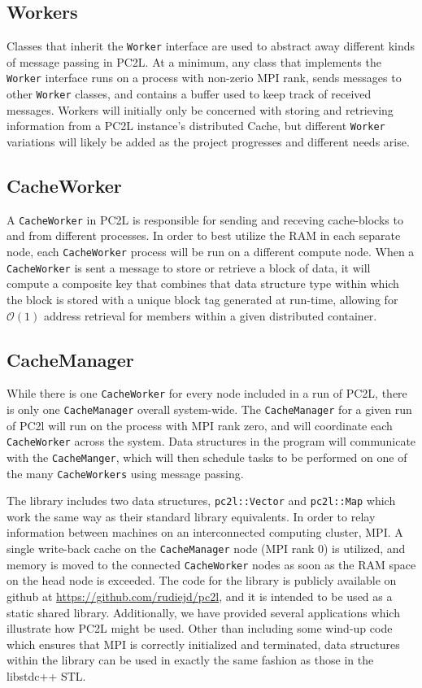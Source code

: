 \subsection{Workers}
Classes that inherit the \texttt{Worker} interface are used to abstract away different kinds of message passing in PC2L. At a minimum, any class that implements the \texttt{Worker} interface runs on a process with non-zerio MPI rank, sends messages to other \texttt{Worker} classes, and contains a buffer used to keep track of received messages. Workers will initially only be concerned with storing and retrieving information from a PC2L instance's distributed Cache, but different \texttt{Worker} variations will likely be added as the project progresses and different needs arise. 

\subsection{CacheWorker} 
A \texttt{CacheWorker} in PC2L is responsible for sending and receving cache-blocks to and from different processes. In order to best utilize the RAM in each separate node, each \texttt{CacheWorker} process will be run on a different compute node. When a \texttt{CacheWorker} is sent a message to store or retrieve a block of data, it will compute a composite key that combines that data structure type within which the block is stored with a unique block tag generated at run-time, allowing for $\mathcal{O}(1)$ address retrieval for members within a given distributed container. 
\subsection{CacheManager}
While there is one \texttt{CacheWorker} for every node included in a run of PC2L, there is only one \texttt{CacheManager} overall system-wide. The \texttt{CacheManager} for a given run of PC2l will run on the process with MPI rank zero, and will coordinate each \texttt{CacheWorker} across the system. Data structures in the program will communicate with the \texttt{CacheManger}, which will then schedule tasks to be performed on one of the many \texttt{CacheWorkers} using message passing.  


The library includes two data structures, \texttt{pc2l::Vector} and \texttt{pc2l::Map} which work the same way as their standard library equivalents. In order to relay information between machines on an interconnected computing cluster, MPI. A single write-back cache on the \texttt{CacheManager} node (MPI rank 0) is utilized, and memory is moved to the connected \texttt{CacheWorker} nodes as soon as the RAM space on the head node is exceeded. The code for the library is publicly available on github at \url{https://github.com/rudiejd/pc2l}, and it is intended to be used as a static shared library. Additionally, we have provided several applications which illustrate how PC2L might be used. Other than including some wind-up code which ensures that MPI is correctly initialized and terminated, data structures within the library can be used in exactly the same fashion as those in the libstdc++ STL.

